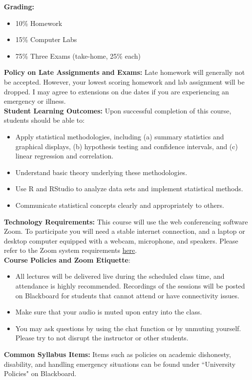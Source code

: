 \documentclass[12pt]{report}
\newenvironment{myitemize}
{ \begin{itemize}
    \setlength{\itemsep}{5pt}
    \setlength{\parskip}{0pt}
    \setlength{\parsep}{0pt}     }
{ \end{itemize}                  }
\begin{document}

\textbf{Grading:}
\begin{myitemize}
\item 10\% Homework
\item 15\% Computer Labs 
\item 75\% Three Exams (take-home, 25\% each)\\
\end{myitemize}


\textbf{Policy on Late Assignments and Exams:}  Late homework will generally not be accepted.  However, your lowest scoring homework and lab assignment will be dropped.  I may agree to extensions on due dates if you are experiencing an emergency or illness.\\

\textbf{Student Learning Outcomes:}  Upon successful completion of this course, students should be able to:
\begin{myitemize}
\item Apply statistical methodologies, including (a) summary statistics and graphical displays, (b) hypothesis testing and confidence intervals, and (c) linear regression and correlation.
\item Understand basic theory underlying these methodologies. 
\item Use R and RStudio to analyze data sets and implement statistical methods.
\item Communicate statistical concepts clearly and appropriately to others.\\ 
\end{myitemize}

\textbf{Technology Requirements:}  This course will use the web conferencing software Zoom.  To participate you will need a stable internet connection,  and a laptop or desktop computer equipped with a webcam, microphone, and speakers.  Please refer to the Zoom system requirements \href{https://support.zoom.us/hc/en-us/articles/201362023-System-requirements-for-Windows-macOS-and-Linux}{here}.\\

\textbf{Course Policies and Zoom Etiquette}:
\begin{myitemize}
\item All lectures will be delivered live during the scheduled class time, and attendance is highly recommended.  Recordings of the sessions will be posted on Blackboard for students that cannot attend or have connectivity issues.   
\item Make sure that your audio is muted upon entry into the class.
\item You may ask questions by using the chat function or by unmuting yourself.  Please try to not disrupt the instructor or other students.\\
\end{myitemize}

\textbf{Common Syllabus Items:}  Items such as policies on academic dishonesty, disability, and handling emergency situations can be found under ``University Policies" on Blackboard.
\end{document}
